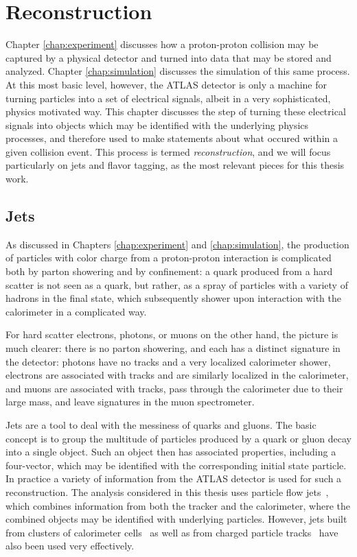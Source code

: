 \chapter{Reconstruction}
\label{chap:reconstruction}

Chapter \ref{chap:experiment} discusses how a proton-proton collision may be captured by a physical 
detector and turned into data that may be stored and analyzed. Chapter \ref{chap:simulation} discusses 
the simulation of this same process. At this most basic level, however, the ATLAS detector is only a machine 
for turning particles into a set of electrical signals, albeit in a very sophisticated, physics motivated way. 
This chapter discusses the step of turning these electrical signals into objects which may be identified 
with the underlying physics processes, and therefore used to make statements about what occured within 
a given collision event. This process is termed \emph{reconstruction}, and we will focus particularly on jets and flavor tagging, as the most relevant pieces for this thesis work.

\section{Jets}
As discussed in Chapters \ref{chap:experiment} and \ref{chap:simulation}, the production of particles with color 
charge from a proton-proton interaction is complicated both by parton showering and by confinement: a quark produced 
from a hard scatter is not seen as a quark, but rather, as a spray of particles with a variety of hadrons in the final 
state, which subsequently shower upon interaction with the calorimeter in a complicated way. 

For hard scatter electrons, photons, or muons on the other hand, the picture is much clearer: there is no parton 
showering, and each has a distinct signature in the detector: photons have no tracks and a very localized calorimeter
shower, electrons are associated with tracks and are similarly localized in the calorimeter, and muons are associated 
with tracks, pass through the calorimeter due to their large mass, and leave signatures in the muon spectrometer.

Jets are a tool to deal with the messiness of quarks and gluons. The basic concept is to group the multitude of
particles produced by a quark or gluon decay into a single object. Such an object then has associated properties, 
including a four-vector, which may be identified with the corresponding initial state particle. In practice a variety 
of information from the ATLAS detector is used for such a reconstruction. The analysis considered in this thesis uses 
particle flow jets~\cite{PERF-2015-09}, which combines information from both the tracker and the calorimeter, where the 
combined objects may be identified with underlying particles. However, jets built from clusters of calorimeter cells~\cite{PERF-2014-07} as well as from charged particle tracks~\cite{ATL-PHYS-PUB-2017-010} have also been used very effectively.


